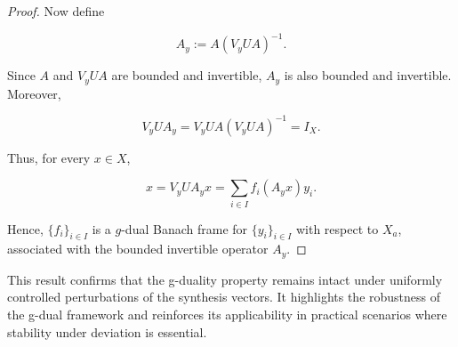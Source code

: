 \documentclass[12pt]{article}
\theoremstyle{definition}
\theoremstyle{remark}
\begin{document}
\begin{proof}
	Now define
	
	$$
	A_y:=A(V_yUA)^{-1}.
	$$
	
	Since \(A\) and \(V_yUA\) are bounded and invertible, \(A_y\) is also
	bounded and invertible. Moreover,
	
	$$
	V_yUA_y
	=
	V_yUA(V_yUA)^{-1}
	=
	I_X.
	$$
	
	Thus, for every \(x\in X\),
	
	$$
	x
	=
	V_yUA_yx
	=
	\sum_{i\in I}f_i(A_yx)y_i.
	$$
	
	Hence, \(\{f_i\}_{i\in I}\) is a \(g\)-dual Banach frame for
	\(\{y_i\}_{i\in I}\) with respect to \(X_a\), associated with the
	bounded invertible operator \(A_y\).
\end{proof}


This result confirms that the g-duality property remains intact under uniformly controlled perturbations of the synthesis vectors. It highlights the robustness of the g-dual framework and reinforces its applicability in practical scenarios where stability under deviation is essential.
\end{document}
